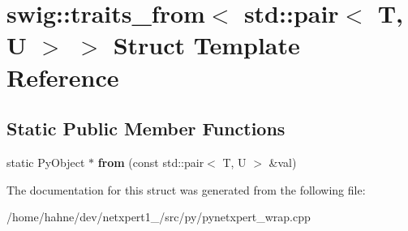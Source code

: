 \hypertarget{structswig_1_1traits__from_3_01std_1_1pair_3_01T_00_01U_01_4_01_4}{}\section{swig\+:\+:traits\+\_\+from$<$ std\+:\+:pair$<$ T, U $>$ $>$ Struct Template Reference}
\label{structswig_1_1traits__from_3_01std_1_1pair_3_01T_00_01U_01_4_01_4}
\subsection*{Static Public Member Functions}
\begin{DoxyCompactItemize}
\item 
static Py\+Object $\ast$ {\bfseries from} (const std\+::pair$<$ T, U $>$ \&val)\hypertarget{structswig_1_1traits__from_3_01std_1_1pair_3_01T_00_01U_01_4_01_4_a8d5dbe4816fb56349947140186869e95}{}\label{structswig_1_1traits__from_3_01std_1_1pair_3_01T_00_01U_01_4_01_4_a8d5dbe4816fb56349947140186869e95}

\end{DoxyCompactItemize}


The documentation for this struct was generated from the following file\+:\begin{DoxyCompactItemize}
\item 
/home/hahne/dev/netxpert1\+\_/src/py/pynetxpert\+\_\+wrap.\+cpp\end{DoxyCompactItemize}

